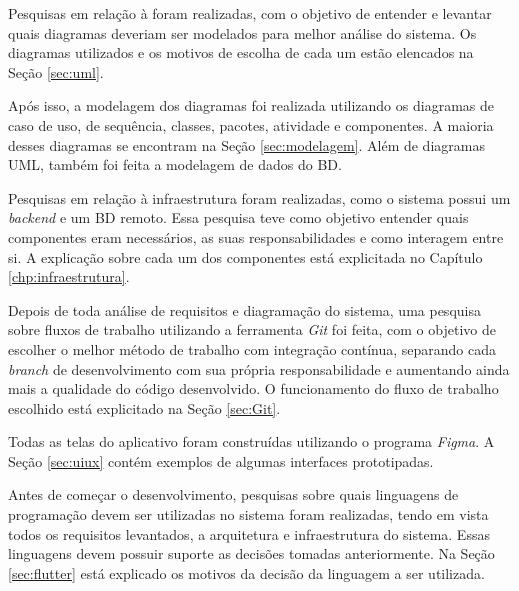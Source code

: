 Pesquisas em relação à   foram realizadas, com o objetivo de entender e levantar quais diagramas deveriam ser modelados para melhor análise do sistema. Os diagramas utilizados e os motivos de escolha de cada um estão elencados na Seção \ref{sec:uml}.

Após isso, a modelagem dos diagramas foi realizada utilizando os diagramas de caso de uso, de sequência, classes, pacotes, atividade e componentes. A maioria desses diagramas se encontram na Seção \ref{sec:modelagem}. Além de diagramas UML, também foi feita a modelagem de dados do BD.

Pesquisas em relação à infraestrutura foram realizadas, como o sistema possui um \textit{backend} e um BD remoto. Essa pesquisa teve como objetivo entender quais componentes eram necessários, as suas responsabilidades e como interagem entre si. A explicação sobre cada um dos componentes está explicitada no Capítulo \ref{chp:infraestrutura}.

Depois de toda análise de requisitos e diagramação do sistema, uma pesquisa sobre fluxos de trabalho utilizando a ferramenta \textit{Git} foi feita, com o objetivo de escolher o melhor método de trabalho com integração contínua, separando cada \textit{branch} de desenvolvimento com sua própria responsabilidade e aumentando ainda mais a qualidade do código desenvolvido. O funcionamento do fluxo de trabalho escolhido está explicitado na Seção \ref{sec:Git}.

Todas as telas do aplicativo foram construídas utilizando o programa \textit{Figma}. A Seção \ref{sec:uiux} contém exemplos de algumas interfaces prototipadas.

Antes de começar o desenvolvimento, pesquisas sobre quais linguagens de programação devem ser utilizadas no sistema foram realizadas, tendo em vista todos os requisitos levantados, a arquitetura e infraestrutura do sistema. Essas linguagens devem possuir suporte as decisões tomadas anteriormente. Na Seção \ref{sec:flutter} está explicado os motivos da decisão da linguagem a ser utilizada.

